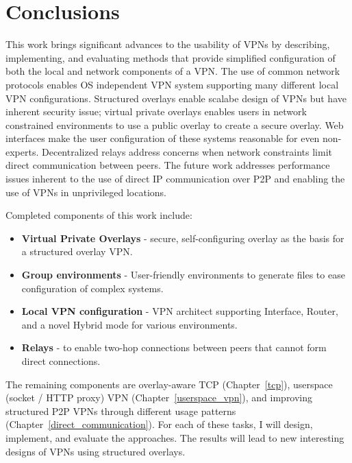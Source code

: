 \chapter{Conclusions}
\label{conclusion}
This work brings significant advances to the usability of VPNs by describing,
implementing, and evaluating methods that provide simplified configuration of
both the local and network components of a VPN.  The use of common network
protocols enables OS independent VPN system supporting many different local VPN
configurations.  Structured overlays enable scalabe design of VPNs but have
inherent security issue; virtual private overlays enables users in network
constrained environments to use a public overlay to create a secure overlay.
Web interfaces make the user configuration of these systems reasonable for even
non-experts.  Decentralized relays address concerns when network constraints
limit direct communication between peers.  The future work addresses
performance issues inherent to the use of direct IP communication over P2P and
enabling the use of VPNs in unprivileged locations.

Completed components of this work include:
\begin{itemize}
\item \textbf{Virtual Private Overlays} - secure, self-configuring overlay as
the basis for a structured overlay VPN.
\item \textbf{Group environments} - User-friendly environments to generate
files to ease configuration of complex systems.
\item \textbf{Local VPN configuration} - VPN architect supporting Interface,
Router, and a novel Hybrid mode for various environments.
\item \textbf{Relays} - to enable two-hop connections between peers that cannot
form direct connections.
\end{itemize}

The remaining components are overlay-aware TCP (Chapter~\ref{tcp}), userspace
(socket / HTTP proxy) VPN (Chapter~\ref{userspace_vpn}), and improving
structured P2P VPNs through different usage patterns
(Chapter~\ref{direct_communication}).  For each of these tasks, I will design,
implement, and evaluate the approaches.  The results will lead to new
interesting designs of VPNs using structured overlays.

